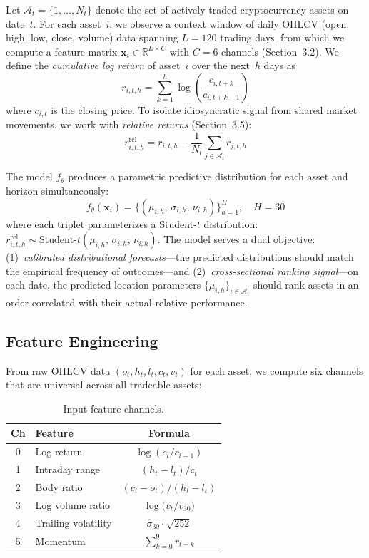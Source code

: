 \documentclass[sigconf]{acmart}
\begin{document}
Let $\mathcal{A}_t = \{1, \ldots, N_t\}$ denote the set of actively traded cryptocurrency assets on date~$t$.
For each asset~$i$, we observe a context window of daily OHLCV (open, high, low, close, volume) data spanning $L = 120$ trading days, from which we compute a feature matrix $\mathbf{x}_i \in \mathbb{R}^{L \times C}$ with $C = 6$ channels (Section~3.2).
We define the \emph{cumulative log return} of asset~$i$ over the next~$h$ days as
\begin{equation}
r_{i,t,h} = \sum_{k=1}^{h} \log\!\left(\frac{c_{i,t+k}}{c_{i,t+k-1}}\right)
\end{equation}
where $c_{i,t}$ is the closing price.
To isolate idiosyncratic signal from shared market movements, we work with \emph{relative returns} (Section~3.5):
\begin{equation}
r^{\text{rel}}_{i,t,h} = r_{i,t,h} - \frac{1}{N_t}\sum_{j \in \mathcal{A}_t} r_{j,t,h}
\label{eq:relative}
\end{equation}

The model $f_\theta$ produces a parametric predictive distribution for each asset and horizon simultaneously:
\begin{equation}
f_\theta(\mathbf{x}_i) = \bigl\{(\mu_{i,h},\, \sigma_{i,h},\, \nu_{i,h})\bigr\}_{h=1}^{H}, \quad H = 30
\end{equation}
where each triplet parameterizes a Student-$t$ distribution: $r^{\text{rel}}_{i,t,h} \sim \text{Student-}t(\mu_{i,h},\, \sigma_{i,h},\, \nu_{i,h})$.
The model serves a dual objective: (1)~\emph{calibrated distributional forecasts}---the predicted distributions should match the empirical frequency of outcomes---and (2)~\emph{cross-sectional ranking signal}---on each date, the predicted location parameters $\{\mu_{i,h}\}_{i \in \mathcal{A}_t}$ should rank assets in an order correlated with their actual relative performance.

\subsection{Feature Engineering}

From raw OHLCV data $(o_t, h_t, l_t, c_t, v_t)$ for each asset, we compute six channels that are universal across all tradeable assets:

\begin{table}[h]
\small
\centering
\caption{Input feature channels.}
\label{tab:features}
\begin{tabular}{clc}
\toprule
Ch & Feature & Formula \\
\midrule
0 & Log return & $\log(c_t / c_{t-1})$ \\
1 & Intraday range & $(h_t - l_t) / c_t$ \\
2 & Body ratio & $(c_t - o_t) / (h_t - l_t)$ \\
3 & Log volume ratio & $\log\bigl(v_t / \widetilde{v}_{30}\bigr)$ \\
4 & Trailing volatility & $\hat{\sigma}_{30} \cdot \sqrt{252}$ \\
5 & Momentum & $\textstyle\sum_{k=0}^{9} r_{t-k}$ \\
\bottomrule
\end{tabular}
\end{table}
\end{document}
